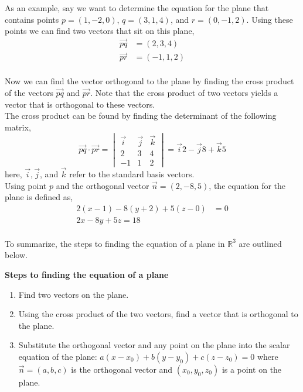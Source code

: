\documentclass[12pt]{article}
\begin{document}
 As an example, say we want to determine the equation for the plane that contains points $p=(1,-2,0)$, $q=(3,1,4)$, and $r = (0,-1,2)$. Using these points we can find two vectors that sit on this plane,
\begin{align*}
\vec{pq} &= (2,3,4) \\
\vec{pr} &= (-1,1,2) \\
\end{align*}

Now we can find the vector orthogonal to the plane by finding the cross product of the vectors $\vec{pq}$ and $\vec{pr}$. Note that the cross product of two vectors yields a vector that is orthogonal to these vectors. \\

 The cross product can be found by finding the determinant of the following matrix,
\[
\vec{pq}\cdot\vec{pr} 
=
\begin{vmatrix}
\vec{i} & \vec{j} & \vec{k} \\
2 & 3 & 4 \\
-1 & 1 & 2
\end{vmatrix}
=
\vec{i}2-\vec{j}8+\vec{k}5
\]
here, $\vec{i},\vec{j}$, and $\vec{k}$ refer to the standard basis vectors. \\

Using point $p$ and the orthogonal vector $\vec{n}=(2,-8,5)$, the equation for the plane is defined as,
\begin{align*}
2(x-1) - 8(y+2) + 5(z-0) &= 0 \\
2x - 8y + 5z = 18 \\
\end{align*}

To summarize, the steps to finding the equation of a plane in $\mathbb{R}^3$ are outlined below. \\

\begin{framed}
\textbf{Steps to finding the equation of a plane}
\begin{enumerate}
\item Find two vectors on the plane.
\item Using the cross product of the two vectors, find a vector that is orthogonal to the plane.
\item Substitute the orthogonal vector and any point on the plane into the scalar equation of the plane: $a(x-x_0)+b(y-y_0)+c(z-z_0)=0$ where $\vec{n}=(a,b,c)$ is the orthogonal vector and $(x_0,y_0,z_0)$ is a point on the plane. \\
\end{enumerate}
\end{framed}
\end{document}
